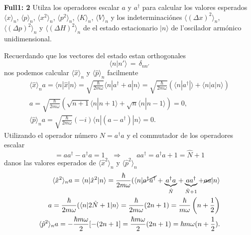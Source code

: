 \begin{ejercicio}
\textbf{Full1: 2} Utilza los operadores escalar $a$ y $a^\dagger$ para calcular los valores
esperados $\langle x \rangle_n$, $\langle p \rangle_n$, $\langle x^2 \rangle_n$,
$\langle p^2 \rangle_n$, $\langle K \rangle_n$, $\langle V \rangle_n$ y los
indeterminaciónes $\langle (\Delta x)^2 \rangle_n$, $\langle(\Delta p)^2\rangle_n$ y
$\langle(\Delta H)^2\rangle_n$ de el estado
estacionario $|n\rangle$ de l'oscilador armónico unidimensional. 
\end{ejercicio}
\begin{solucion}
Recuerdando que los vectores del estado estan orthogonales
\begin{equation*}
	\langle n | n' \rangle \,=\, \delta_{nn'}
\end{equation*}
nos podemos calcular $\langle \hat x \rangle_n$ y $\langle \hat p \rangle_n$
facilmente 
\begin{align*}
	\langle \hat x \rangle_n a= \langle n | \hat x | n \rangle =
\sqrt{\frac{\hbar}{2m\omega}} \langle n| a^\dagger + a | n \rangle 
	= \sqrt{\frac{\hbar}{2m\omega}} (\langle n | a^\dagger | \rangle +
\langle n | a | n \rangle ) \\
	a = \sqrt{\frac{\hbar}{2m\omega}} (\sqrt{n+1} \langle
n| n+1\rangle + \sqrt{n} \langle n|n-1\rangle) = 0,\\
	\langle \hat p \rangle_n a= \sqrt{\frac{\hbar}{2m\omega}} (-i) \langle n |
(a - a^\dagger) | n \rangle = 0.
\end{align*}
Utilizando el operador número $N = a^\dagger a$ y el commutador de los
operadores escalar
\begin{equation*}
	[a, a^\dagger] = aa^\dagger - a^\dagger a = 1 \quad \Rightarrow \qquad a
a^\dagger = a^\dagger a + 1 = \hat N + 1	
\end{equation*}
danos las valores esperados de $\langle \hat x^2 \rangle_n$ y $\langle \hat p^2
\rangle_n$
\begin{align*}
	\langle \hat x^2 \rangle_n a= \langle n | \hat x^2 | n \rangle =
\frac{\hbar}{2m\omega} (\langle n | \cancel{a^\dagger a^\dagger} +
\underbrace{a^\dagger a}_{\hat N} + \underbrace{aa^\dagger}_{\hat N + 1} +
\cancel{aa} | n\rangle  \\
	a= \frac{\hbar}{2m\omega} (\langle n | 2 \hat N + 1 | n \rangle =
\frac{\hbar}{2m\omega} (2n +1) = \frac{\hbar}{m\omega}
\left(n+\frac{1}{2}\right) \\
	\langle \hat p^2 \rangle_n a= -\frac{\hbar m \omega}{2} [-(2n +1] =
\frac{\hbar m \omega}{2} (2n + 1) = \hbar m \omega (n + \frac{1}{2}).	

\end{align*}
\end{solucion}
